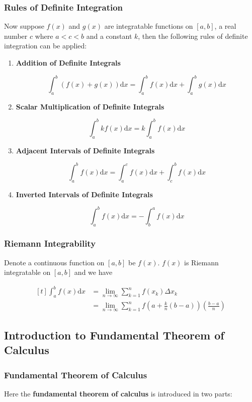 \documentclass[a4paper,12pt]{article}
\newcommand{\diff}{\mathrm{d}}
\newenvironment{alist}{ %
\begin{enumerate}[label=(\alph*)]
}{
\end{enumerate}
}
\begin{document}
\subsubsection{Rules of Definite Integration}
Now suppose $f(x)$ and $g(x)$ are integratable functions on $[a,b]$, a real number $c$ where $a<c<b$ and a constant $k$, then the following rules of definite integration can be applied:

\begin{alist}
  \item \textbf{Addition of Definite Integrals}

  $$\int_{a}^{b}(f(x)+g(x))\diff x=\int_{a}^{b}f(x)\diff x+\int_{a}^{b}g(x)\diff x$$

  \item \textbf{Scalar Multiplication of Definite Integrals}

  $$\int_{a}^{b}kf(x)\diff x=k\int_{a}^{b}f(x)\diff x$$

  \item \textbf{Adjacent Intervals of Definite Integrals}

  $$\int_{a}^{b}f(x)\diff x=\int_{a}^{c}f(x)\diff x+\int_{c}^{b}f(x)\diff x$$

  \item \textbf{Inverted Intervals of Definite Integrals}

  $$\int_{a}^{b}f(x)\diff x=-\int_{b}^{a}f(x)\diff x$$
\end{alist}

\subsubsection{Riemann Integrability}
Denote a continuous function on $[a,b]$ be $f(x)$. $f(x)$ is Riemann integratable on $[a,b]$ and we have

$$\begin{aligned}[t]
  \int_{a}^{b}f(x)\diff x&=\lim_{n\to\infty}\sum_{k=1}^{n}f(x_{k})\Delta x_{k}\\
  &=\lim_{n\to\infty}\sum_{k=1}^{n}f(a+\frac{k}{n}(b-a))(\frac{b-a}{n})
\end{aligned}$$

\subsection{Introduction to Fundamental Theorem of Calculus}
\subsubsection{Fundamental Theorem of Calculus}
Here the \textbf{fundamental theorem of calculus} is introduced in two parts:
\end{document}
